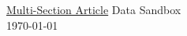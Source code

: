 \documentclass[12pt,english]{article}
\begin{document}
\begingroup
  \centering
  \LARGE \href{https://fanwangecon.github.io/Tex4Econ/#5-multi-section-article}{Multi-Section Article} Data Sandbox \\
  \large \today \par
\endgroup


% 
% 


\end{document}
